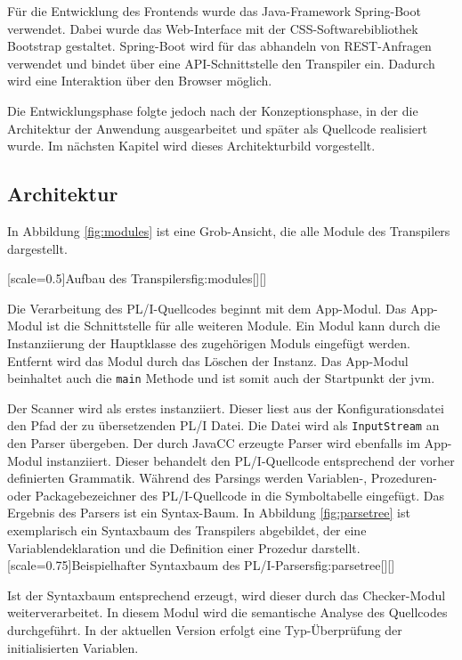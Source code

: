 Für die Entwicklung des Frontends wurde das Java-Framework Spring-Boot verwendet.
Dabei wurde das Web-Interface mit der CSS-Softwarebibliothek Bootstrap gestaltet.
Spring-Boot wird für das abhandeln von REST-Anfragen verwendet und bindet über eine API-Schnittstelle den Transpiler ein. Dadurch wird eine Interaktion über den Browser möglich.

Die Entwicklungsphase folgte jedoch nach der Konzeptionsphase, in der die Architektur der Anwendung ausgearbeitet und später als Quellcode realisiert wurde. 
Im nächsten Kapitel wird dieses Architekturbild vorgestellt.

\pagebreak
\subsection{Architektur} 

In Abbildung \ref{fig:modules} ist eine Grob-Ansicht, die alle Module des Transpilers dargestellt.

[scale=0.5]{Aufbau des Transpilers}{fig:modules}[][]

Die Verarbeitung des PL/I-Quellcodes beginnt mit dem App-Modul. Das App-Modul ist die Schnittstelle für alle weiteren Module. Ein Modul kann durch die Instanziierung der Hauptklasse des zugehörigen Moduls eingefügt werden. Entfernt wird das Modul durch das Löschen der Instanz. Das App-Modul beinhaltet auch die \verb+main+ Methode und ist somit auch der Startpunkt der \ac{jvm}.

Der Scanner wird als erstes instanziiert. Dieser liest aus der Konfigurationsdatei den Pfad der zu übersetzenden PL/I Datei. Die Datei wird als \verb+InputStream+ an den Parser übergeben.
Der durch JavaCC erzeugte Parser wird ebenfalls im App-Modul instanziiert. Dieser behandelt den PL/I-Quellcode entsprechend der vorher definierten Grammatik.  Während des Parsings werden Variablen-, Prozeduren- oder Packagebezeichner des PL/I-Quellcode in die Symboltabelle eingefügt. Das Ergebnis des Parsers ist ein Syntax-Baum. 
In Abbildung \ref{fig:parsetree} ist exemplarisch ein Syntaxbaum des Transpilers abgebildet, der eine Variablendeklaration und die Definition einer Prozedur darstellt.
\pagebreak
{}[scale=0.75]{Beispielhafter Syntaxbaum des PL/I-Parsers}{fig:parsetree}[][]

Ist der Syntaxbaum entsprechend erzeugt, wird dieser durch das Checker-Modul weiterverarbeitet. In diesem Modul wird die semantische Analyse des Quellcodes durchgeführt. In der aktuellen Version erfolgt eine Typ-Überprüfung der initialisierten Variablen.

